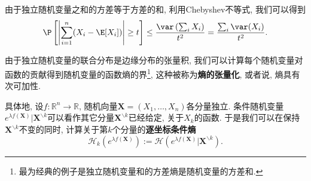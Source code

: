 由于独立随机变量之和的方差等于方差的和, 利用Chebyshev不等式, 我们可以得到
\begin{equation*}
	\P \left[ \left|\sum_{i=1}^n (X_i - \E[X_i]) \right| \geq t \right]
	\leq \frac{\var\left(\sum_i  X_i\right)}{t^2}
	= \frac{\sum_i \var(X_i)}{t^2}. 
\end{equation*}

\sp 

由于独立随机变量的联合分布是边缘分布的张量积, 我们可以计算每个随机变量对函数的贡献得到随机变量的函数熵的界\footnote{最为经典的例子是独立随机变量和的方差熵是随机变量的方差和.}, 这种被称为\textbf{熵的张量化}, 或者说, 熵具有次可加性.


具体地, 设$f \colon \mathbb{R}^n \to \mathbb{R}$, 随机向量$\bm{X} = (X_1, \dots, X_n)$各分量独立. 
条件随机变量$e^{\lambda f(\bm{X})} | \bm{X}^{\backslash k}$可以看作其它分量$\bm{X}^{\backslash k}$已经给定, 关于$X_k$的函数. 
于是我们可以在保持$\bm{X}^{\backslash k}$不变的同时, 计算关于第$k$个分量的\textbf{逐坐标条件熵}
\begin{equation*}
	\mathcal{H}_k ( e^{\lambda f(\bm{X})} )
	:= \mathcal{H} ( e^{\lambda f(\bm{X})} | \bm{X}^{\backslash k} ). 
\end{equation*}

